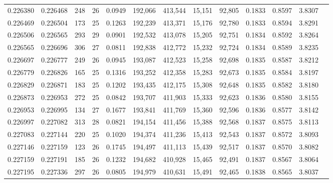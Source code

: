 \begin{tabular}{rrrrrrrrrrrrr}
0.226380 & 0.226468 &   248 &  26 &                                     0.0949 & 192,066 & 413,544 &  15,151 &  92,805 & 0.1833 & 0.8597 & 3.8307 \\
0.226469 & 0.226504 &   173 &  25 &                                     0.1263 & 192,239 & 413,371 &  15,176 &  92,780 & 0.1833 & 0.8594 & 3.8291 \\
0.226506 & 0.226565 &   293 &  29 &                                     0.0901 & 192,532 & 413,078 &  15,205 &  92,751 & 0.1834 & 0.8592 & 3.8264 \\
0.226565 & 0.226696 &   306 &  27 &                                     0.0811 & 192,838 & 412,772 &  15,232 &  92,724 & 0.1834 & 0.8589 & 3.8235 \\
0.226697 & 0.226777 &   249 &  26 &                                     0.0945 & 193,087 & 412,523 &  15,258 &  92,698 & 0.1835 & 0.8587 & 3.8212 \\
0.226779 & 0.226826 &   165 &  25 &                                     0.1316 & 193,252 & 412,358 &  15,283 &  92,673 & 0.1835 & 0.8584 & 3.8197 \\
0.226829 & 0.226871 &   183 &  25 &                                     0.1202 & 193,435 & 412,175 &  15,308 &  92,648 & 0.1835 & 0.8582 & 3.8180 \\
0.226873 & 0.226953 &   272 &  25 &                                     0.0842 & 193,707 & 411,903 &  15,333 &  92,623 & 0.1836 & 0.8580 & 3.8155 \\
0.226953 & 0.226995 &   134 &  27 &                                     0.1677 & 193,841 & 411,769 &  15,360 &  92,596 & 0.1836 & 0.8577 & 3.8142 \\
0.226997 & 0.227082 &   313 &  28 &                                     0.0821 & 194,154 & 411,456 &  15,388 &  92,568 & 0.1837 & 0.8575 & 3.8113 \\
0.227083 & 0.227144 &   220 &  25 &                                     0.1020 & 194,374 & 411,236 &  15,413 &  92,543 & 0.1837 & 0.8572 & 3.8093 \\
0.227146 & 0.227159 &   123 &  26 &                                     0.1745 & 194,497 & 411,113 &  15,439 &  92,517 & 0.1837 & 0.8570 & 3.8082 \\
0.227159 & 0.227191 &   185 &  26 &                                     0.1232 & 194,682 & 410,928 &  15,465 &  92,491 & 0.1837 & 0.8567 & 3.8064 \\
0.227195 & 0.227336 &   297 &  26 &                                     0.0805 & 194,979 & 410,631 &  15,491 &  92,465 & 0.1838 & 0.8565 & 3.8037 \\

\end{tabular}
